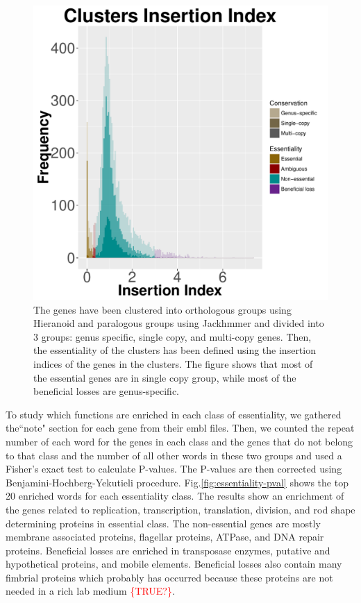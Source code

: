 \documentclass[12pt,letterpaper]{article}
\begin{document}
\begin{figure}
\centering
\includegraphics[scale=0.5]{cluster-essentiality.pdf}
\caption{The genes have been clustered into orthologous groups using Hieranoid and paralogous groups using Jackhmmer and divided into 3 groups: genus specific, single copy, and multi-copy genes. Then, the essentiality of the clusters has been defined using the insertion indices of the genes in the clusters. The figure shows that most of the essential genes are in single copy group, while most of the beneficial losses are genus-specific.}
\label{fig:iidist}
\end{figure}

To study which functions are enriched in each class of essentiality, we gathered the``note" section for each gene from their embl files. Then, we counted the repeat number of each word for the genes in each class and the genes that do not belong to that class and the number of all other words in these two groups and used a Fisher's exact test to calculate P-values. The P-values are then corrected using Benjamini-Hochberg-Yekutieli procedure. Fig.\@ \ref{fig:essentiality-pval} shows the top 20 enriched words for each essentiality class. The results show an enrichment of the genes related to replication, transcription, translation, division, and rod shape determining proteins in essential class. The non-essential genes are mostly membrane associated proteins, flagellar proteins, ATPase, and DNA repair proteins. Beneficial losses are enriched in transposase enzymes, putative and hypothetical proteins, and mobile elements. Beneficial losses also contain many fimbrial proteins which probably has occurred because these proteins are not needed in a rich lab medium \textcolor{red}{\{TRUE?\}}.
\end{document}
